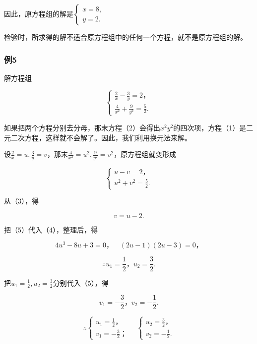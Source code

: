因此，原方程组的解是\(\left\{ \begin{array}{l} x = 8, \\ y = 2. \end{array} \right.\)

检验时，所求得的解不适合原方程组中的任何一个方程，就不是原方程组的解。

\subsubsection{例5}

解方程组

\[
\left\{ \begin{array}{l} \frac{2}{x} - \frac{3}{y} = 2\text{，} \\ \frac{4}{x ^ {2}} + \frac{9}{y ^ {2}} = \frac{5}{2}. \end{array} \right. \tag{1}
\]

如果把两个方程分别去分母，那末方程（2）会得出\(x^{2}y^{2}\)的四次项，方程（1）是二元二次方程，这样就不会解了。因此，我们利用换元法来解。

设\(\frac{2}{x} = u, \frac{3}{y} = v\)，那末\(\frac{4}{x^2} = u^2, \frac{9}{y^2} = v^2\)，原方程组就变形成

\[
\left\{ \begin{array}{l} u - v = 2\text{，} \\ u ^ {2} + v ^ {2} = \frac{5}{2}. \end{array} \right. \tag{3}
\]

从（3），得

\[
v = u - 2. \tag{5}
\]

把（5）代入（4），整理后，得

\[
4 u ^ {3} - 8 u + 3 = 0\text{，} \quad (2 u - 1) (2 u - 3) = 0\text{，}
\]

\[
\therefore u _ {1} = \frac{1}{2}\text{，} u _ {2} = \frac{3}{2}.
\]

把\(u_{1} = \frac{1}{2}, u_{2} = \frac{3}{2}\)分别代入（5），得

\[
v _ {1} = - \frac{3}{2}\text{，} v _ {2} = - \frac{1}{2}.
\]

\[
\therefore \left\{ \begin{array}{l} u _ {1} = \frac{1}{2}\text{，} \\ v _ {1} = - \frac{3}{2}\text{；} \end{array} \right. \quad \left\{ \begin{array}{l} u _ {2} = \frac{3}{2}\text{，} \\ v _ {2} = - \frac{1}{2}. \end{array} \right.
\]


